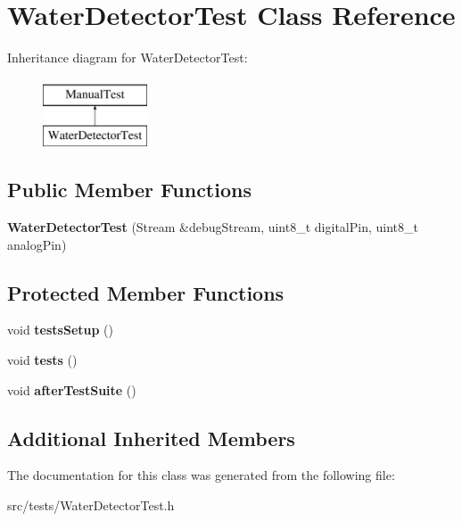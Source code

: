 \hypertarget{class_water_detector_test}{}\section{Water\+Detector\+Test Class Reference}
\label{class_water_detector_test}
Inheritance diagram for Water\+Detector\+Test\+:\begin{figure}[H]
\begin{center}
\leavevmode
\includegraphics[height=2.000000cm]{class_water_detector_test}
\end{center}
\end{figure}
\subsection*{Public Member Functions}
\begin{DoxyCompactItemize}
\item 
\mbox{\label{class_water_detector_test_a22961d4d362a815532ba60c96d46ee4b}} 
{\bfseries Water\+Detector\+Test} (Stream \&debug\+Stream, uint8\+\_\+t digital\+Pin, uint8\+\_\+t analog\+Pin)
\end{DoxyCompactItemize}
\subsection*{Protected Member Functions}
\begin{DoxyCompactItemize}
\item 
\mbox{\label{class_water_detector_test_ae7db8346c9f226ebb421e2b8e593cc7b}} 
void {\bfseries tests\+Setup} ()
\item 
\mbox{\label{class_water_detector_test_a85fcf9d1f00031b961bad2600ee54796}} 
void {\bfseries tests} ()
\item 
\mbox{\label{class_water_detector_test_a18b0d5ee4b383e89a3e8a8ea2fd47e40}} 
void {\bfseries after\+Test\+Suite} ()
\end{DoxyCompactItemize}
\subsection*{Additional Inherited Members}


The documentation for this class was generated from the following file\+:\begin{DoxyCompactItemize}
\item 
src/tests/Water\+Detector\+Test.\+h\end{DoxyCompactItemize}
